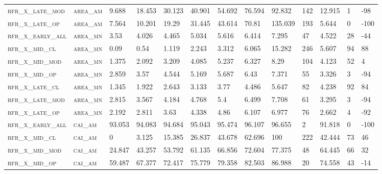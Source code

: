 \begin{landscape}
\begin{center}
\begin{footnotesize}
\begin{longtable}{lllllllllllll}
\textsc{rfr\_x\_late\_mod } & \textsc{area\_am  }   & 9.688   & 18.453  & 30.123   & 40.901   & 54.692   & 76.594   & 92.832   & 142  & 12.915  & 1   & -98   \\
\textsc{rfr\_x\_late\_op  } & \textsc{area\_am  }   & 7.564   & 10.201  & 19.29    & 31.445   & 43.614   & 70.81    & 135.039  & 193  & 5.644   & 0   & -100  \\
\textsc{rfr\_x\_early\_all} & \textsc{area\_mn  }   & 3.53    & 4.026   & 4.465    & 5.034    & 5.616    & 6.414    & 7.295    & 47   & 4.522   & 28  & -44   \\
\textsc{rfr\_x\_mid\_cl   } & \textsc{area\_mn  }   & 0.09    & 0.54    & 1.119    & 2.243    & 3.312    & 6.065    & 15.282   & 246  & 5.607   & 94  & 88    \\
\textsc{rfr\_x\_mid\_mod  } & \textsc{area\_mn  }   & 1.375   & 2.092   & 3.209    & 4.085    & 5.237    & 6.327    & 8.29     & 104  & 4.123   & 52  & 4     \\
\textsc{rfr\_x\_mid\_op   } & \textsc{area\_mn  }   & 2.859   & 3.57    & 4.544    & 5.169    & 5.687    & 6.43     & 7.371    & 55   & 3.326   & 3   & -94   \\
\textsc{rfr\_x\_late\_cl  } & \textsc{area\_mn  }   & 1.345   & 1.922   & 2.643    & 3.133    & 3.77     & 4.486    & 5.647    & 82   & 4.238   & 92  & 84    \\
\textsc{rfr\_x\_late\_mod } & \textsc{area\_mn  }   & 2.815   & 3.567   & 4.184    & 4.768    & 5.4      & 6.499    & 7.708    & 61   & 3.295   & 3   & -94   \\
\textsc{rfr\_x\_late\_op  } & \textsc{area\_mn  }   & 2.192   & 2.811   & 3.63     & 4.338    & 4.86     & 6.107    & 6.977    & 76   & 2.662   & 4   & -92   \\
\textsc{rfr\_x\_early\_all} & \textsc{cai\_am   }   & 93.053  & 94.083  & 94.684   & 95.043   & 95.474   & 96.107   & 96.655   & 2    & 91.818  & 0   & -100  \\
\textsc{rfr\_x\_mid\_cl   } & \textsc{cai\_am   }   & 0       & 3.125   & 15.385   & 26.837   & 43.678   & 62.696   & 100      & 222  & 42.444  & 73  & 46    \\
\textsc{rfr\_x\_mid\_mod  } & \textsc{cai\_am   }   & 24.847  & 43.257  & 53.792   & 61.135   & 66.856   & 72.604   & 77.375   & 48   & 64.445  & 66  & 32    \\
\textsc{rfr\_x\_mid\_op   } & \textsc{cai\_am   }   & 59.487  & 67.377  & 72.417   & 75.779   & 79.358   & 82.503   & 86.988   & 20   & 74.558  & 43  & -14   \\

\end{longtable}
\end{footnotesize}
\end{center}
\end{landscape}
